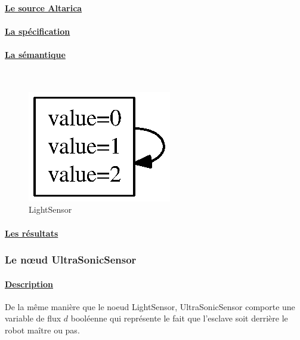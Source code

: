     \paragraph{\underline{Le source Altarica\\}}
    
   
    \paragraph{\underline{La spécification\\}}
    

    \paragraph{\underline{La sémantique\\}}
    ~\\
    \begin{figure}[!ht]
     \begin{center}
      \includegraphics{../src/altarica/LightSensor.eps}
      \caption{LightSensor}
     \end{center}
    \end{figure}

    \paragraph{\underline{Les résultats\\}}
    
    
   
   \subsubsection{Le n\oe{}ud UltraSonicSensor}
   
    \paragraph{\underline{Description\\}}
    De la même manière que le noeud LightSensor, UltraSonicSensor
    comporte une variable de flux $d$ booléenne qui représente le fait
    que l'esclave soit derrière le robot maître ou pas.

